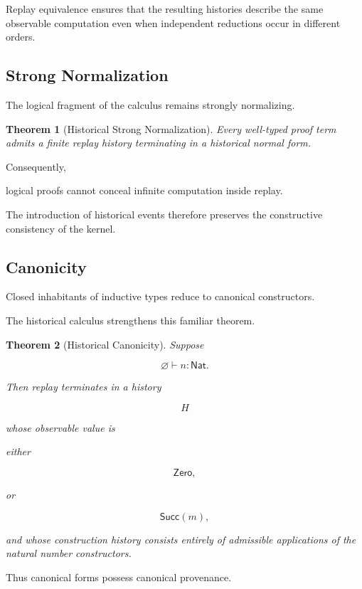 \documentclass[12pt,oneside]{article}
\newtheorem{theorem}{Theorem}[section]
\theoremstyle{definition}
\theoremstyle{remark}
\begin{document}
Replay equivalence ensures that the resulting histories describe the same
observable computation even when independent reductions occur in different
orders.

\subsection{Strong Normalization}

The logical fragment of the calculus remains strongly normalizing.

\begin{theorem}[Historical Strong Normalization]

Every well-typed proof term admits a finite replay history terminating in a
historical normal form.

\end{theorem}

Consequently,

logical proofs cannot conceal infinite computation inside replay.

The introduction of historical events therefore preserves the constructive
consistency of the kernel.

\subsection{Canonicity}

Closed inhabitants of inductive types reduce to canonical constructors.

The historical calculus strengthens this familiar theorem.

\begin{theorem}[Historical Canonicity]

Suppose

\[
\varnothing
\vdash
n
:
\mathsf{Nat}.
\]

Then replay terminates in a history

\[
H
\]

whose observable value is

either

\[
\mathsf{Zero},
\]

or

\[
\mathsf{Succ}(m),
\]

and whose construction history consists entirely of admissible applications of
the natural number constructors.

\end{theorem}

Thus canonical forms possess canonical provenance.
\end{document}
